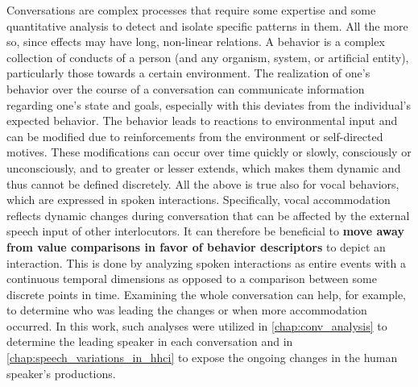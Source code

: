 Conversations are complex processes that require some expertise and some quantitative analysis to detect and isolate specific patterns in them.
All the more so, since effects may have long, non-linear relations.
A behavior is a complex collection of conducts of a person (and any organism, system, or artificial entity), particularly those towards a certain environment.
The realization of one's behavior over the course of a conversation can communicate information regarding one's state and goals, especially with this deviates from the individual's expected behavior.
The behavior leads to reactions to environmental input and can be modified due to reinforcements from the environment or self-directed motives.
These modifications can occur over time quickly or slowly, consciously or unconsciously, and to greater or lesser extends, which makes them dynamic and thus cannot be defined discretely.
All the above is true also for vocal behaviors, which are expressed in spoken interactions.
Specifically, vocal accommodation reflects dynamic changes during conversation that can be affected by the external speech input of other interlocutors.
It can therefore be beneficial to \textbf{move away from value comparisons in favor of behavior descriptors} to depict an interaction.
This is done by analyzing spoken interactions as entire events with a continuous temporal dimensions as opposed to a comparison between some discrete points in time.
Examining the whole conversation can help, for example, to determine who was leading the changes or when more accommodation occurred.
In this work, such analyses were utilized in \cref{chap:conv_analysis} to determine the leading speaker in each conversation and in \cref{chap:speech_variations_in_hhci} to expose the ongoing changes in the human speaker's productions.

